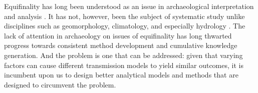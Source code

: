 Equifinality has long been understood as an issue in archaeological interpretation and analysis .  It has not, however, been the subject of systematic study unlike disciplines such as geomorphology, climatology, and especially  hydrology  .  The lack of attention in archaeology on issues of equifinality has long thwarted progress towards consistent method development and cumulative knowledge generation.  And the problem is one that can be addressed:  given that varying factors can cause different transmission models to yield similar outcomes, it is incumbent upon us to design better analytical models and methods that are designed to circumvent the problem.  


